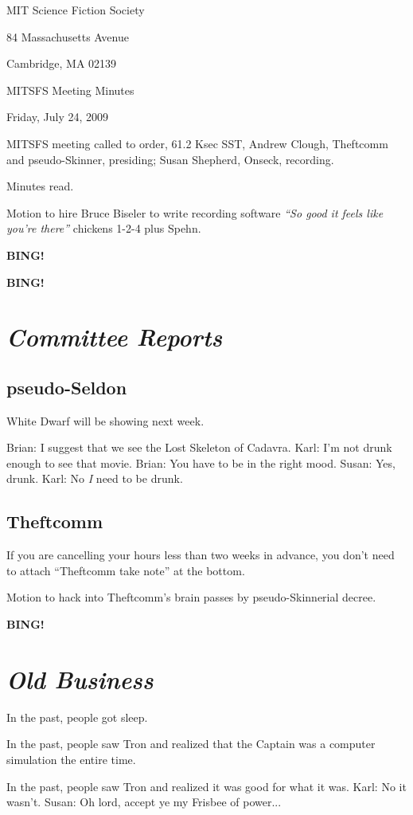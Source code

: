 \documentclass[10pt]{article}
\newcommand{\bing}{{\bf BING!} }
\newcommand{\goto}[1]{\bing \vskip 12pt \section*{{\em{#1}}}}
\newcommand{\ps}{ plus Spehn\xspace}
\begin{document}
\begin{center}

MIT Science Fiction Society

84 Massachusetts Avenue

Cambridge, MA 02139

\vspace{12pt}

MITSFS Meeting Minutes

Friday, July 24, 2009

\end{center}

\vspace{18pt}

\setlength{\parskip}{6pt}

\noindent
MITSFS meeting called to order, 61.2 Ksec SST,
Andrew Clough, Theftcomm and pseudo-Skinner, presiding; Susan Shepherd, Onseck, recording.

Minutes read.

Motion to hire Bruce Biseler to write recording software \emph{``So good it feels like you're there''} chickens 1-2-4\ps.

\bing

\goto{Committee Reports}

\subsection*{pseudo-Seldon}White Dwarf will be showing next week.

Brian: I suggest that we see the Lost Skeleton of Cadavra.
Karl: I'm not drunk enough to see that movie.
Brian: You have to be in the right mood.
Susan: Yes, drunk.
Karl: No \emph{I} need to be drunk.

\subsection*{Theftcomm} If you are cancelling your hours less than two weeks in advance, you don't need to attach ``Theftcomm take note'' at the bottom.

Motion to hack into Theftcomm's brain passes by pseudo-Skinnerial decree.

\goto{Old Business}

In the past, people got sleep.

In the past, people saw Tron and realized that the Captain was a computer simulation the entire time.

In the past, people saw Tron and realized it was good for what it was.
Karl: No it wasn't.
Susan: Oh lord, accept ye my Frisbee of power...
\end{document}
